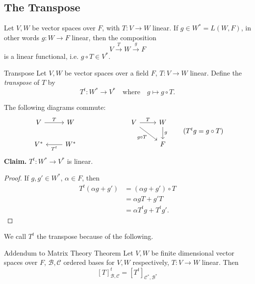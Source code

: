 \documentclass[class=article, crop=false]{standalone}
\begin{document}
  \subsection{The Transpose}
  Let $V,W$ be vector spaces over $F$, with $T\colon V\to W$ linear. If $g\in W^* = L(W, F)$, in other words $g\colon W\to F$ linear, then the composition
  \[
    V\xrightarrow{T}W\xrightarrow{g}F
  \]
  is a linear functional, i.e. $g\circ T\in V^*$.
  \begin{definition}{Transpose}
    Let $V, W$ be vector spaces over a field $F$, $T\colon V\to W$ linear. Define the \emph{transpose} of $T$ by
    \[
      T^t\colon W^*\to V^* \quad \text{where}\quad g\mapsto g\circ T. \tag{$T^tg\ceq g\circ T$ for all $g\in W^*$}
    \]
  \end{definition}
  The following diagrams commute:
  \[\begin{tikzcd}
    V & W \\
    {V^*} & {W^*}
    \arrow["{T^t}", from=2-2, to=2-1]
    \arrow["T", from=1-1, to=1-2]
  \end{tikzcd}
  \hspace{1in}
  \begin{tikzcd}
    V & W \\
    & F
    \arrow["g", from=1-2, to=2-2]
    \arrow["T", from=1-1, to=1-2]
    \arrow["{g\circ T}"', from=1-1, to=2-2]
  \end{tikzcd}\tag{$T^tg = g\circ T$}\]
  \textbf{Claim.} $T^t\colon W^*\to V^*$ is linear.
  \begin{proof}
    If $g, g'\in W^*$, $\alpha\in F$, then
    \begin{align*}
      T^t(\alpha g + g') &= (\alpha g + g')\circ T \\
                         &= \alpha gT + g'T \\
                         &= \alpha T^tg + T^tg'.
    \end{align*}
  \end{proof}
  We call $T^t$ the transpose because of the following.
  \begin{theorem}{Addendum to Matrix Theory Theorem}
    Let $V, W$ be finite dimensional vector spaces over $F$, $\mathcal{B},\mathcal{C}$ ordered bases for $V, W$ respectively, $T\colon V\to W$ linear. Then
    \[
      [T]_{\mathcal{B},\mathcal{C}}^t = [T^t]_{\mathcal{C}^*,\mathcal{B}^*}
    \]
  \end{theorem}
\end{document}
